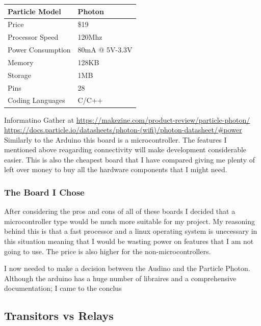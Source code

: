 \documentclass{article}
\begin{document}
\begin{tabularx}{\textwidth}{| X | X |}
    \hline
    Particle Model   &    Photon     \\ \hline
    Price            &     \$19      \\ \hline
    Processor Speed  &    120Mhz     \\ \hline
    Power Consumption& 80mA @ 5V-3.3V\\ \hline
    Memory           &    128KB      \\ \hline
    Storage          &     1MB       \\ \hline
    Pins             &     28        \\ \hline
    Coding Languages &    C/C++      \\ \hline
\end{tabularx}
\newline

Informatino Gather at \url{https://makezine.com/product-review/particle-photon/}
\url{https://docs.particle.io/datasheets/photon-(wifi)/photon-datasheet/#power} \\


Similarly to the Arduino this board is a microcontroller. The features I mentioned above reagarding
connectivity will make development considerable easier. This is also the cheapest board that I have
compared giving me plenty of left over money to buy all the hardware components that I might need.


\subsubsection{The Board I Chose}

After considering the pros and cons of all of these boards I decided that a microcontroller type 
would be much more suitable for my project. My reasoning behind this is that a fast processor and
a linux operating system is unecessary in this situation meaning that I would be wasting power on
features that I am not going to use. The price is also higher for the non-microcontrollers.

I now needed to make a decision between the Audino and the Particle Photon. Although the arduino has
a huge number of libraires and a comprehensive documentation; I came to the conclus

\subsection{Transitors vs Relays}
\end{document}
